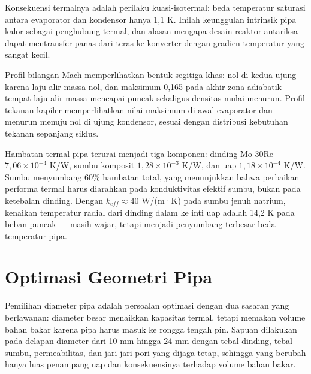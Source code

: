 \documentclass[
  indonesian,
  12pt,
  a4paper,
]{report}
\begin{document}
Konsekuensi termalnya adalah perilaku kuasi-isotermal: beda temperatur
saturasi antara evaporator dan kondensor hanya 1,1 K. Inilah keunggulan
intrinsik pipa kalor sebagai penghubung termal, dan alasan mengapa
desain reaktor antariksa dapat mentransfer panas dari teras ke konverter
dengan gradien temperatur yang sangat kecil.

Profil bilangan Mach memperlihatkan bentuk segitiga khas: nol di kedua
ujung karena laju alir massa nol, dan maksimum 0,165 pada akhir zona
adiabatik tempat laju alir massa mencapai puncak sekaligus densitas
mulai menurun. Profil tekanan kapiler memperlihatkan nilai maksimum di
awal evaporator dan menurun menuju nol di ujung kondensor, sesuai dengan
distribusi kebutuhan tekanan sepanjang siklus.

Hambatan termal pipa terurai menjadi tiga komponen: dinding Mo-30Re
\(7,06\times10^{-4}\) K/W, sumbu komposit \(1,28\times10^{-3}\) K/W, dan
uap \(1,18\times10^{-4}\) K/W. Sumbu menyumbang 60\% hambatan total,
yang menunjukkan bahwa perbaikan performa termal harus diarahkan pada
konduktivitas efektif sumbu, bukan pada ketebalan dinding. Dengan
\(k_{eff} \approx 40\) W/(m·K) pada sumbu jenuh natrium, kenaikan
temperatur radial dari dinding dalam ke inti uap adalah 14,2 K pada
beban puncak --- masih wajar, tetapi menjadi penyumbang terbesar beda
temperatur pipa.

\section{Optimasi Geometri Pipa}\label{optimasi-geometri-pipa}

Pemilihan diameter pipa adalah persoalan optimasi dengan dua sasaran
yang berlawanan: diameter besar menaikkan kapasitas termal, tetapi
memakan volume bahan bakar karena pipa harus masuk ke rongga tengah pin.
Sapuan dilakukan pada delapan diameter dari 10 mm hingga 24 mm dengan
tebal dinding, tebal sumbu, permeabilitas, dan jari-jari pori yang
dijaga tetap, sehingga yang berubah hanya luas penampang uap dan
konsekuensinya terhadap volume bahan bakar.
\end{document}
